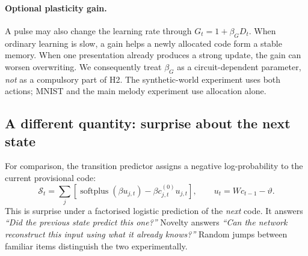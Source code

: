 \documentclass[11pt,a4paper]{article}
\newcommand{\softplus}{\operatorname{softplus}}
\begin{document}
\paragraph{Optional plasticity gain.}
A pulse may also change the learning rate through $G_t=1+\beta_GD_t$. When ordinary learning is slow, a gain helps a newly allocated code form a stable memory. When one presentation already produces a strong update, the gain can worsen overwriting. We consequently treat $\beta_G$ as a circuit-dependent parameter, \emph{not} as a compulsory part of H2. The synthetic-world experiment uses both actions; MNIST and the main melody experiment use allocation alone.

\subsection{A different quantity: surprise about the next state}\label{sec:surprise}
For comparison, the transition predictor assigns a negative log-probability to the current provisional code:
\[
\mathcal S_t=\sum_j\left[\softplus(\beta u_{j,t})-\beta c^{(0)}_{j,t}u_{j,t}\right],\qquad u_t=Wc_{t-1}-\vartheta.
\]
This is surprise under a factorised logistic prediction of the \emph{next} code. It answers \emph{``Did the previous state predict this one?''} Novelty answers \emph{``Can the network reconstruct this input using what it already knows?''} Random jumps between familiar items distinguish the two experimentally.
\end{document}
